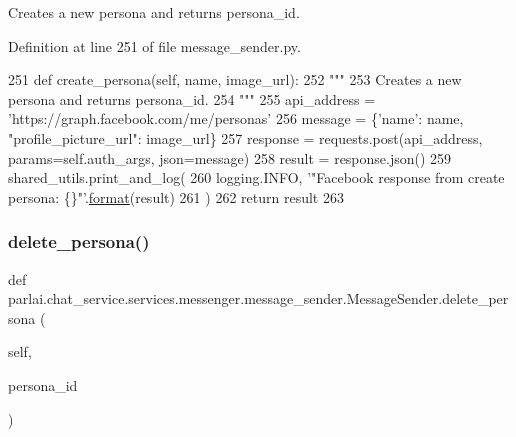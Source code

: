 \begin{DoxyVerb}Creates a new persona and returns persona_id.
\end{DoxyVerb}
 

Definition at line 251 of file message\+\_\+sender.\+py.


\begin{DoxyCode}
251     \textcolor{keyword}{def }create\_persona(self, name, image\_url):
252         \textcolor{stringliteral}{"""}
253 \textcolor{stringliteral}{        Creates a new persona and returns persona\_id.}
254 \textcolor{stringliteral}{        """}
255         api\_address = \textcolor{stringliteral}{'https://graph.facebook.com/me/personas'}
256         message = \{\textcolor{stringliteral}{'name'}: name, \textcolor{stringliteral}{"profile\_picture\_url"}: image\_url\}
257         response = requests.post(api\_address, params=self.auth\_args, json=message)
258         result = response.json()
259         shared\_utils.print\_and\_log(
260             logging.INFO, \textcolor{stringliteral}{'"Facebook response from create persona: \{\}"'}.\hyperlink{namespaceparlai_1_1chat__service_1_1services_1_1messenger_1_1shared__utils_a32e2e2022b824fbaf80c747160b52a76}{format}(result)
261         )
262         \textcolor{keywordflow}{return} result
263 
\end{DoxyCode}
\mbox{\label{classparlai_1_1chat__service_1_1services_1_1messenger_1_1message__sender_1_1MessageSender_a511cc34a215c25dfeed69810523eb8e4}} 
\subsubsection{\texorpdfstring{delete\+\_\+persona()}{delete\_persona()}}
{\footnotesize\ttfamily def parlai.\+chat\+\_\+service.\+services.\+messenger.\+message\+\_\+sender.\+Message\+Sender.\+delete\+\_\+persona (\begin{DoxyParamCaption}\item[{}]{self,  }\item[{}]{persona\+\_\+id }\end{DoxyParamCaption})}

